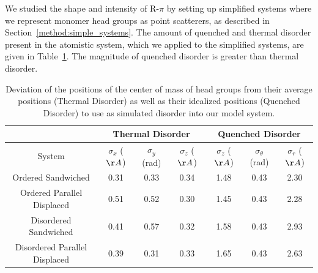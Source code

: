 \documentclass[journal=jpcbfk,manuscript=article]{achemso}
\begin{document}
  We studied the shape and intensity of R-$\pi$ by setting up simplified systems
  where we represent monomer head groups as point scatterers, as described in 
  Section~\ref{method:simple_systems}. The amount of quenched and thermal disorder
  present in the atomistic system, which we applied to the simplified systems, are
  given in Table~\ref{table:quenched_disorder}. The magnitude of quenched disorder
  is greater than thermal disorder.
  
  \begin{table}[h]
  \centering
  \begin{tabular}{c|ccc|ccc}
  \toprule
   		                        &           \multicolumn{3}{c}{Thermal Disorder}             &             \multicolumn{3}{c}{Quenched Disorder}               \\
  \midrule
  System                        & $\sigma_x$ ($\AA$) & $\sigma_y$ (rad) & $\sigma_z$ ($\AA$) & $\sigma_z$ ($\AA$) & $\sigma_\theta$ (rad) & $\sigma_r$ ($\AA$) \\
  \midrule
  Ordered Sandwiched            &         0.31       &       0.33       &        0.34        &        1.48        &     0.43              &     2.30           \\
  Ordered Parallel Displaced    &         0.51       &       0.52       &        0.30        &        1.45        &     0.43              &     2.28           \\ 
  Disordered Sandwiched         &         0.41       &       0.57       &        0.32        &        1.58        &     0.43              &     2.93           \\
  Disordered Parallel Displaced &         0.39       &       0.31       &        0.33        &        1.65        &     0.43              &     2.63           \\
  \bottomrule
  \end{tabular}
  \caption{Deviation of the positions of the center of mass of head groups from their average
  positions (Thermal Disorder) as well as their idealized positions (Quenched Disorder) to use 
  as simulated disorder into our model system.}
  \label{table:quenched_disorder} 
  \end{table}
\end{document}
